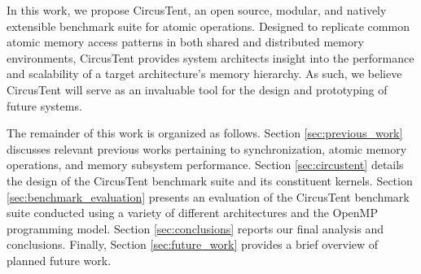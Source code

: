 
In this work, we propose CircusTent, an open source, modular, and natively extensible benchmark suite for atomic operations.
Designed to replicate common atomic memory access patterns in both shared and distributed memory environments, CircusTent provides system architects insight into the performance and scalability of a target architecture's memory hierarchy.
As such, we believe CircusTent will serve as an invaluable tool for the design and prototyping of future systems.

The remainder of this work is organized as follows.
Section \ref{sec:previous_work} discusses relevant previous works pertaining to synchronization, atomic memory operations, and memory subsystem performance.
Section \ref{sec:circustent} details the design of the CircusTent benchmark suite and its constituent kernels.
Section \ref{sec:benchmark_evaluation} presents an evaluation of the CircusTent benchmark suite conducted using a variety of different architectures and the OpenMP programming model.
Section \ref{sec:conclusions} reports our final analysis and conclusions.
Finally, Section \ref{sec:future_work} provides a brief overview of planned future work.